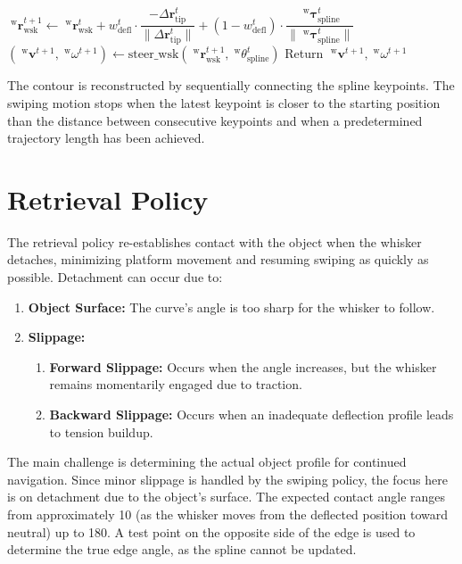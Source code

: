 \begin{algorithm}[htb]
\begin{algorithmic}
        \State \(\;^{\mathrm{w}}\boldsymbol{r}_{\mathrm{wsk}}^{t+1} \gets \;^{\mathrm{w}}\boldsymbol{r}_{\mathrm{wsk}}^{t} + w_{\mathrm{defl}}^{t} \cdot \dfrac{-\Delta\boldsymbol{r}_{\mathrm{tip}}^{t}}{\|\Delta\boldsymbol{r}_{\mathrm{tip}}^{t}\|} + (1 - w_{\mathrm{defl}}^{t}) \cdot \dfrac{\;^{\mathrm{w}}\boldsymbol{\tau}_{\mathrm{spline}}^{t}}{\|\;^{\mathrm{w}}\boldsymbol{\tau}_{\mathrm{spline}}^{t}\|}\) 
        \State
        \State
        \State \((\;^{\mathrm{w}}\boldsymbol{v}^{t+1}, \;^{\mathrm{w}}\omega^{t+1}) \gets \mathrm{steer\_wsk}(\;^{\mathrm{w}}\boldsymbol{r}_{\mathrm{wsk}}^{t+1},\;^{\mathrm{w}}\theta_{\mathrm{spline}}^{t})\)
        \State Return \(\;^{\mathrm{w}}\boldsymbol{v}^{t+1}, \;^{\mathrm{w}}\omega^{t+1}\)
    \end{algorithmic}
    \label{alg:swiping_policy}
\end{algorithm}

The contour is reconstructed by sequentially connecting the spline keypoints.
The swiping motion stops when the latest keypoint is closer to the starting position than the distance between consecutive keypoints and when a predetermined trajectory length has been achieved.


\section{Retrieval Policy}

The retrieval policy re-establishes contact with the object when the whisker detaches, minimizing platform movement and resuming swiping as quickly as possible.
Detachment can occur due to:
\begin{enumerate}
    \item \textbf{Object Surface:} The curve's angle is too sharp for the whisker to follow.
    \item \textbf{Slippage:}
    \begin{enumerate}
        \item \textbf{Forward Slippage:} Occurs when the angle increases, but the whisker remains momentarily engaged due to traction.
        \item \textbf{Backward Slippage:} Occurs when an inadequate deflection profile leads to tension buildup.
    \end{enumerate}
\end{enumerate}

The main challenge is determining the actual object profile for continued navigation.
Since minor slippage is handled by the swiping policy, the focus here is on detachment due to the object's surface.
The expected contact angle ranges from approximately 10\textdegree{} (as the whisker moves from the deflected position toward neutral) up to 180\textdegree.
A test point on the opposite side of the edge is used to determine the true edge angle, as the spline cannot be updated.

